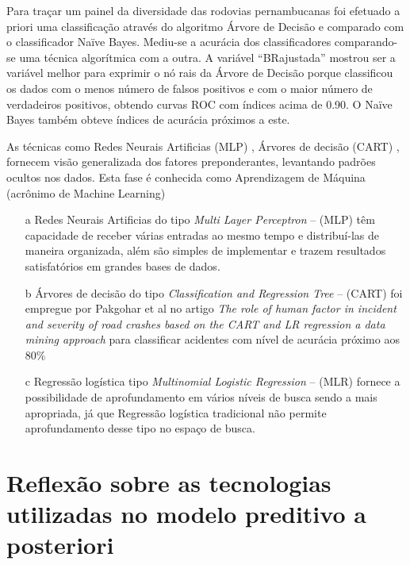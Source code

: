 Para traçar um painel da diversidade das rodovias pernambucanas foi efetuado a priori uma classificação através do algoritmo Árvore de Decisão e comparado com o classificador Naïve Bayes. Mediu-se a acurácia dos classificadores comparando-se uma técnica algorítmica com a outra. A variável ``BRajustada'' mostrou ser a variável melhor para exprimir o nó rais da Árvore de Decisão porque classificou os dados com o menos número de falsos positivos e com o maior número de verdadeiros positivos, obtendo curvas ROC com índices acima de 0.90. O Naïve Bayes também obteve índices de acurácia próximos a este.

As técnicas como Redes Neurais Artificias (MLP) \cite{DecisaoCredito}, Árvores de decisão (CART) \cite{DataMining},  
 fornecem visão generalizada dos fatores preponderantes, levantando padrões ocultos nos dados. Esta fase é conhecida como 
Aprendizagem de Máquina (acrônimo de Machine Learning)

\begin{itemize}
 \item[a] Redes Neurais Artificias do tipo \textit{ Multi Layer Perceptron}  -- (MLP) têm capacidade de receber várias entradas ao mesmo tempo e distribuí-las de maneira organizada, além 
	  são simples de implementar e trazem resultados satisfatórios em grandes bases de dados.
 
 \item[b] Árvores de decisão do tipo \textit{ Classification and Regression Tree}  -- (CART) foi empregue por Pakgohar et al no artigo 
	  \textit{The role of human factor in incident and severity of road crashes based on the CART and LR regression a data mining approach}  para classificar acidentes 
	  com nível de acurácia próximo aos 80\%

 \item[c] Regressão logística tipo \textit{Multinomial Logistic Regression} -- (MLR) fornece a possibilidade de aprofundamento em vários níveis de busca sendo a mais apropriada, já que Regressão logística 
	  tradicional não permite aprofundamento desse tipo no espaço de busca.
\end{itemize}



\section{Reflexão sobre as tecnologias utilizadas no modelo preditivo a posteriori}\label{resultPost}


